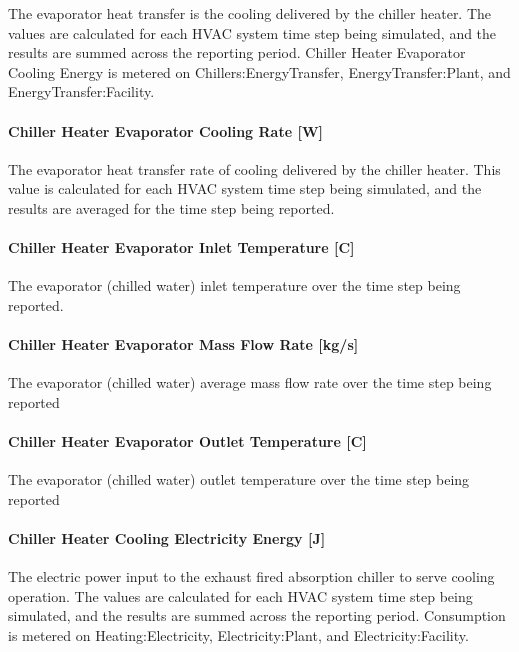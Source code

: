The evaporator heat transfer is the cooling delivered by the chiller heater. The values are calculated for each HVAC system time step being simulated, and the results are summed across the reporting period. Chiller Heater Evaporator Cooling Energy is metered on Chillers:EnergyTransfer, EnergyTransfer:Plant, and EnergyTransfer:Facility.

\paragraph{Chiller Heater Evaporator Cooling Rate {[}W{]}}\label{chiller-heater-evaporator-cooling-rate-w}

The evaporator heat transfer rate of cooling delivered by the chiller heater. This value is calculated for each HVAC system time step being simulated, and the results are averaged for the time step being reported.

\paragraph{Chiller Heater Evaporator Inlet Temperature {[}C{]}}\label{chiller-heater-evaporator-inlet-temperature-c}

The evaporator (chilled water) inlet temperature over the time step being reported.

\paragraph{Chiller Heater Evaporator Mass Flow Rate {[}kg/s{]}}\label{chiller-heater-evaporator-mass-flow-rate-kgs}

The evaporator (chilled water) average mass flow rate over the time step being reported

\paragraph{Chiller Heater Evaporator Outlet Temperature {[}C{]}}\label{chiller-heater-evaporator-outlet-temperature-c}

The evaporator (chilled water) outlet temperature over the time step being reported

\paragraph{Chiller Heater Cooling Electricity Energy {[}J{]}}\label{chiller-heater-cooling-electric-energy-j-1}

The electric power input to the exhaust fired absorption chiller to serve cooling operation. The values are calculated for each HVAC system time step being simulated, and the results are summed across the reporting period. Consumption is metered on Heating:Electricity, Electricity:Plant, and Electricity:Facility.

